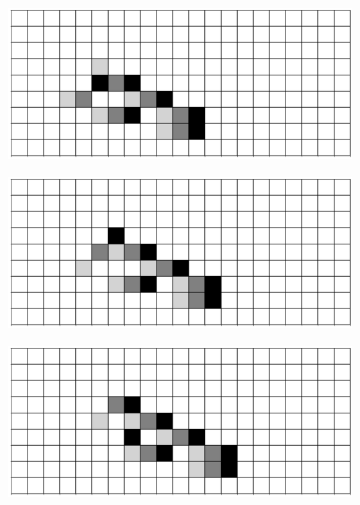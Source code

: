 \documentclass[12pt]{article}
\numberwithin{figure}{section} %
\begin{document}
\begin{figure}[H]
\begin{subfigure}{0.45\textwidth}
     		\subcaption{}
   	\end{subfigure}
    	\begin{subfigure}{0.45\textwidth}
     		\includegraphics[width=\linewidth]{Section4/35.3}
     		\subcaption{}
   	\end{subfigure}
	\newline
	\begin{subfigure}[t]{0.06\textwidth}
		\centering
		\phantom{H}
  	\end{subfigure}	
	\begin{subfigure}{0.45\textwidth}
     		\includegraphics[width=\linewidth]{Section4/35.4}
     		\subcaption{}
   	\end{subfigure}
    	\begin{subfigure}{0.45\textwidth}
     		\includegraphics[width=\linewidth]{Section4/35.5}
     		\subcaption{}

\end{subfigure}
\end{figure}
\end{document}
